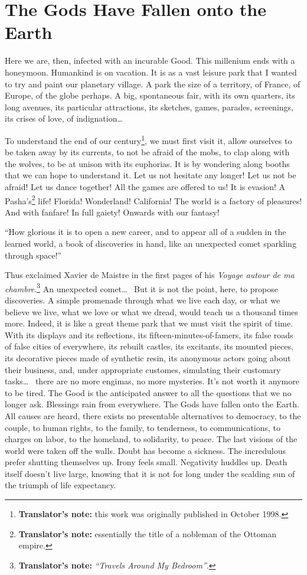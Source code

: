 \chapter{The Gods Have Fallen onto the Earth}
\label{ch:1}

Here we are, then, infected with an incurable Good. This millenium ends with a honeymoon. Humankind is on vacation. It is as a vast leisure park that I wanted to try and paint our planetary village. A park the size of a territory, of France, of Europe, of the globe perhaps. A big, spontaneous fair, with its own quarters, its long avenues, its particular attractions, its sketches, games, parades, screenings, its crises of love, of indignation\dots~

To understand the end of our century\footnote{\textbf{Translator's note:} this work was originally published in October 1998.}, we must first visit it, allow ourselves to be taken away by its currents, to not be afraid of the mobs, to clap along with the wolves, to be at unison with its euphorias. It is by wondering along booths that we can hope to understand it. Let us not hesitate any longer! Let us not be afraid! Let us dance together! All the games are offered to us! It is evasion! A Pasha's\footnote{\textbf{Translator's note:} essentially the title of a nobleman of the Ottoman empire.} life! Florida! Wonderland! California! The world is a factory of pleasures! And with fanfare! In full gaiety! Onwards with our fantasy!

``How glorious it is to open a new career, and to appear all of a sudden in the learned world, a book of discoveries in hand, like an unexpected comet sparkling through space!''

Thus exclaimed Xavier de Maistre in the first pages of his \textit{Voyage autour de ma chambre}.\footnote{\textbf{Translator's note:} \textit{``Travels Around My Bedroom''}.} An unexpected comet\dots~ But it is not the point, here, to propose discoveries. A simple promenade through what we live each day, or what we believe we live, what we love or what we dread, would teach us a thousand times more. Indeed, it is like a great theme park that we must visit the spirit of time. With its displays and its reflections, its fifteen-minutes-of-famers, its false roads of false cities of everywhere, its rebuilt castles, its excitants, its mounted pieces, its decorative pieces made of synthetic resin, its anonymous actors going about their business, and, under appropriate customes, simulating their customary tasks\dots~ there are no more engimas, no more mysteries. It's not worth it anymore to be tired. The Good is the anticipated answer to all the questions that we no longer ask. Blessings rain from everywhere. The Gods have fallen onto the Earth. All causes are heard, there exists no presentable alternatives to democracy, to the couple, to human rights, to the family, to tenderness, to communications, to charges on labor, to the homeland, to solidarity, to peace. The last visions of the world were taken off the walls. Doubt has become a sickness. The incredulous prefer shutting themselves up. Irony feels small. Negativity huddles up. Death itself doesn't live large, knowing that it is not for long under the scalding sun of the triumph of life expectancy.

